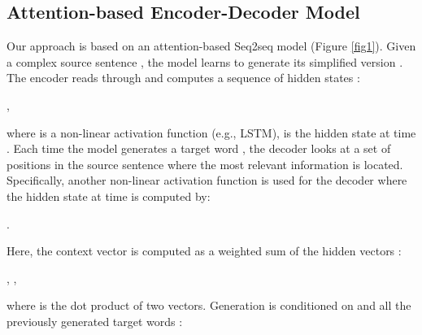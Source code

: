 \documentclass[11pt,a4paper]{article}
\begin{document}
\subsection{Attention-based Encoder-Decoder Model}
\label{sec3.1}
Our approach is based on an attention-based Seq2seq model \cite{Bahdanau:15} (Figure \ref{fig1}). Given a complex source sentence , the model learns to generate its simplified version . The encoder reads through  and computes a sequence of hidden states :
\begin{center}
,
\end{center}
where  is a non-linear activation function (e.g., LSTM),  is the hidden state at time . Each time the model generates a target word , the decoder looks at a set of positions in the source sentence where the most relevant information is located. Specifically, another non-linear activation function  is used for the decoder where the hidden state  at time  is computed by:
\begin{center}
.
\end{center}
Here, the context vector  is computed as a weighted sum of the hidden vectors :
\begin{center}
, \hspace*{8mm}
,
\end{center}
where  is the dot product of two vectors. Generation is conditioned on  and all the previously generated target words :
\end{document}
